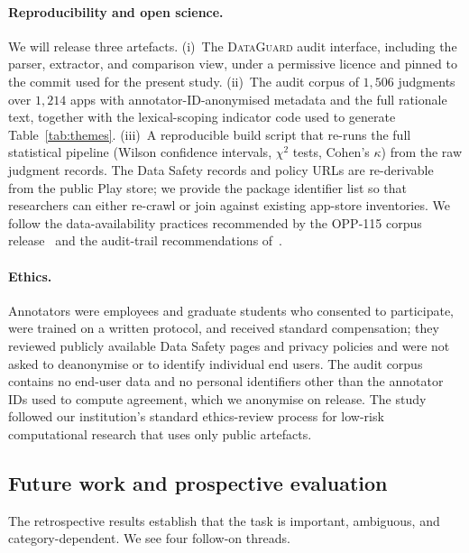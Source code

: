 \documentclass[11pt,a4paper]{article}
\newcommand{\dataguard}{\textsc{DataGuard}}
\begin{document}
\paragraph{Reproducibility and open science.}
We will release three artefacts. (i)~The \dataguard{} audit interface,
including the parser, extractor, and comparison view, under a permissive
licence and pinned to the commit used for the present study.
(ii)~The audit corpus of $1{,}506$ judgments over $1{,}214$ apps with
annotator-ID-anonymised metadata and the full rationale text, together
with the lexical-scoping indicator code used to generate
Table~\ref{tab:themes}. (iii)~A reproducible build script that re-runs
the full statistical pipeline (Wilson confidence intervals,
$\chi^{2}$ tests, Cohen's $\kappa$) from the raw judgment records. The
Data Safety records and policy URLs are re-derivable from the public
Play store; we provide the package identifier list so that researchers
can either re-crawl or join against existing app-store inventories.
We follow the data-availability practices recommended by the OPP-115
corpus release~\citep{wilson2016creation} and the audit-trail
recommendations of~\citet{andow2019policylint,andow2020policheck}.

\paragraph{Ethics.}
Annotators were employees and graduate students who consented to
participate, were trained on a written protocol, and received standard
compensation; they reviewed publicly available Data Safety pages and
privacy policies and were not asked to deanonymise or to identify
individual end users. The audit corpus contains no end-user data and
no personal identifiers other than the annotator IDs used to compute
agreement, which we anonymise on release. The study followed our
institution's standard ethics-review process for low-risk computational
research that uses only public artefacts.

\subsection{Future work and prospective evaluation}
\label{sec:future}
The retrospective results establish that the task is important,
ambiguous, and category-dependent. We see four follow-on threads.
\end{document}
